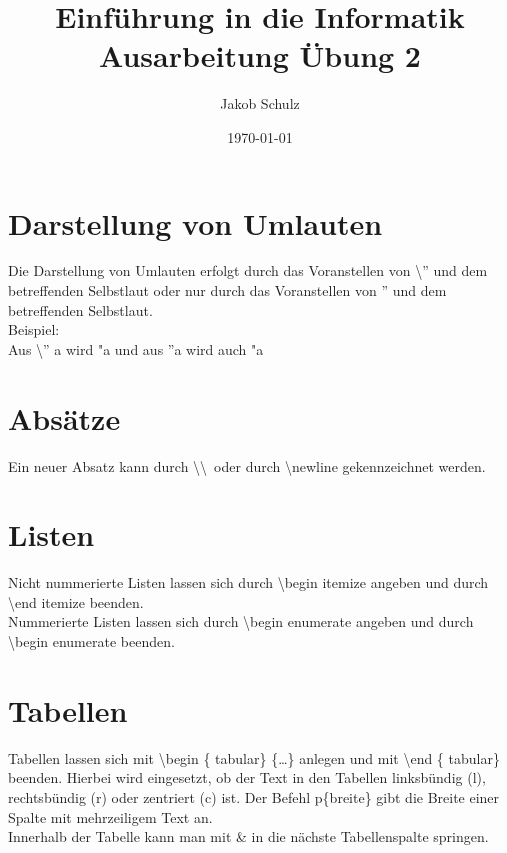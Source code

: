 \documentclass[a4paper,11pt,titlepage]{article}
\begin{document}
\title{Einf\"uhrung in die Informatik\\
Ausarbeitung \"Ubung 2}


\author{Jakob Schulz}


\date{\today}

\maketitle{\thispagestyle{plain}}

\section{Darstellung von Umlauten}
Die Darstellung von Umlauten erfolgt durch das Voranstellen von \textbackslash'' und dem betreffenden Selbstlaut oder nur durch das Voranstellen von '' und dem betreffenden Selbstlaut. \\
Beispiel: \\ Aus \textbackslash'' a wird "a und aus ''a wird auch "a


\section{Absätze}
Ein neuer Absatz kann durch \textbackslash \textbackslash ~oder durch \textbackslash newline gekennzeichnet werden.

\section{Listen}
Nicht nummerierte Listen lassen sich durch \textbackslash begin itemize angeben und durch \textbackslash end itemize beenden.\\
Nummerierte Listen lassen sich durch \textbackslash begin enumerate angeben und durch \textbackslash begin enumerate beenden.

\section{Tabellen}
Tabellen lassen sich mit \textbackslash begin \{ tabular\} \{\dots\} anlegen und mit \textbackslash end \{ tabular\} beenden.
Hierbei wird eingesetzt, ob der Text in den Tabellen linksbündig (l), rechtsbündig (r) oder zentriert (c) ist. Der Befehl p\{breite\} gibt die Breite einer Spalte mit mehrzeiligem 
Text an. \\
Innerhalb der Tabelle kann man mit \& in die nächste Tabellenspalte springen.
\end{document}
